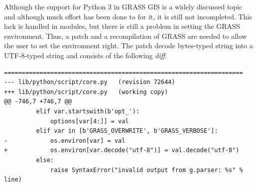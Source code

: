 Although the support for Python 3 in GRASS GIS is a widely discussed topic and
although much effort has been done to for it, it is still not incompleted. This
lack is handled in modules, but there is still a problem in setting the GRASS
environment. Thus, a patch and a recompilation of GRASS are needed to allow the
user to set the environment right. The patch decode bytes-typed string into a
UTF-8-typed string and consists of the following \textit{diff}.

{\scriptsize
\begin{lstlisting}[basicstyle={\footnotesize\ttfamily},breaklines=True,
backgroundcolor = \color{light-gray}]
===================================================================
--- lib/python/script/core.py	(revision 72644)
+++ lib/python/script/core.py	(working copy)
@@ -746,7 +746,7 @@
         elif var.startswith(b'opt_'):
             options[var[4:]] = val
         elif var in [b'GRASS_OVERWRITE', b'GRASS_VERBOSE']:
-            os.environ[var] = val
+            os.environ[var.decode("utf-8")] = val.decode("utf-8")
         else:
             raise SyntaxError("invalid output from g.parser: %s" % line)
\end{lstlisting}}
